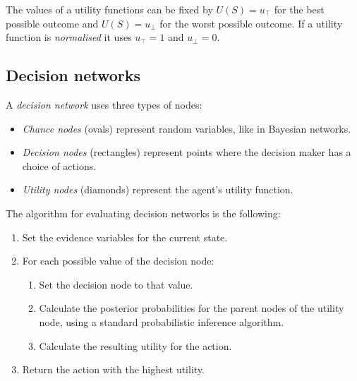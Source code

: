 \documentclass{article}
\begin{document}
\begin{definition}[R\&N p. 615]
    The values of a utility functions can be fixed by $U(S)=u_\top$ for the
    best possible outcome and $U(S)=u_\bot$ for the worst possible outcome.
    If a utility function is \emph{normalised} it uses $u_\top = 1$ and
    $u_\bot = 0$.
\end{definition}

\subsection{Decision networks}

\begin{definition}[R\&N p. 626]
    A \emph{decision network} uses three types of nodes:
    \begin{itemize}
        \item \emph{Chance nodes} (ovals) represent random variables, like in Bayesian networks.
        \item \emph{Decision nodes} (rectangles) represent points where the decision maker
        has a choice of actions. 
        \item \emph{Utility nodes} (diamonds) represent the agent's utility function.
    \end{itemize}
\end{definition}

\begin{theorem}[R\&N p. 628]
    The algorithm for evaluating decision networks is the following:
    \begin{enumerate}
        \item Set the evidence variables for the current state.
        \item For each possible value of the decision node: \begin{enumerate}
            \item Set the decision node to that value.
            \item Calculate the posterior probabilities for the parent nodes of
            the utility node, using a standard probabilistic inference algorithm.
            \item Calculate the resulting utility for the action.
        \end{enumerate}
        \item Return the action with the highest utility.
    \end{enumerate}
\end{theorem}
\end{document}
